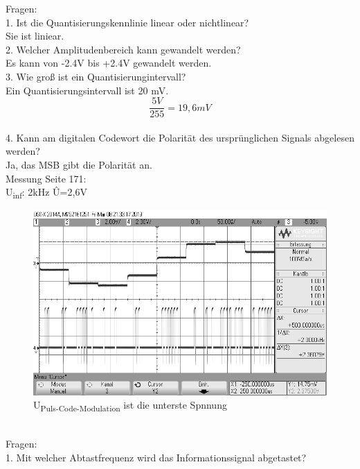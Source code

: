 \documentclass[12pt,a4paper]{scrartcl}
\begin{document}
	\newpage
	Fragen: \\
	1. Ist die Quantisierungskennlinie linear oder nichtlinear?\\
	Sie ist liniear.\\
	2. Welcher Amplitudenbereich kann gewandelt werden?\\ Es kann von -2.4V bis +2.4V gewandelt werden.\\
	3. Wie groß ist ein Quantisierungintervall?\\
	Ein Quantisierungsintervall ist 20 mV.
	\begin{equation}
    	\label{eq:5.1}
		\frac{5V}{255} = 19,6mV
    \end{equation}\\
    4. Kann am digitalen Codewort die Polarität des ursprünglichen Signals abgelesen werden?\\
    Ja, das MSB gibt die Polarität an.\\
    Messung Seite 171:\\
    U\textsubscript{inf}:  2kHz \^{U}=2,6V\\
     \begin{figure}[htbp]
    \begin{minipage}{1\textwidth}
         \centering
         \includegraphics[width=1\textwidth]{scope_26}
         \caption{U\textsubscript{Puls-Code-Modulation} ist die unterste Spnnung}
   
          \label{fig:scope_26}
    \end{minipage}
    \end{figure}\\
    \newpage
    Fragen:\\
    1. Mit welcher Abtastfrequenz wird das Informationssignal abgetastet?\\
\end{document}
